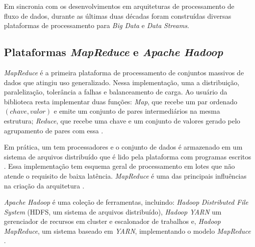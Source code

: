 

Em sincronia com os desenvolvimentos em arquiteturas de processamento de fluxo de dados,
durante as últimas duas décadas foram construídas diversas plataformas de
processamento para \emph{Big Data} e \emph{Data Streams}.

\subsection{Plataformas \emph{MapReduce} e \emph{Apache Hadoop}}

\emph{MapReduce} é a primeira plataforma de processamento de conjuntos massivos
de dados que atingiu uso generalizado.
Nessa implementação, uma 
a distribuição, paralelização, tolerância a falhas e balanceamento de
carga.
Ao usuário da biblioteca resta implementar duas funções:
\emph{Map}, que recebe um par ordenado
$(chave, valor)$ e emite um conjunto de pares intermediários na mesma estrutura;
\emph{Reduce}, que recebe uma chave e um conjunto de valores gerado pelo agrupamento
de pares com essa
 \cite{Dean2004}.

Em prática, um \notahl{!!} tem  processadores e o conjunto de dados é
armazenado em um sistema de arquivos distribuído que é lido pela plataforma com
programas escritos .
Essa implementação tem esquema geral de processamento em lotes que não atende o
requisito de baixa latência.
\nobreakdash \emph{MapReduce} é uma das principais influências na criação da arquitetura
\lambdaa \cite{marz2015big}.

\emph{Apache Hadoop} é uma coleção de ferramentas, incluindo: \emph{Hadoop
Distributed File System} (HDFS, um sistema de arquivos distribuído), \emph{Hadoop
YARN} um gerenciador de recursos em cluster e escalonador de trabalhos e,
\emph{Hadoop MapReduce}, um sistema baseado em \emph{YARN}, implementando o modelo
\emph{MapReduce} \cite{ApacheHadoop2020}.

